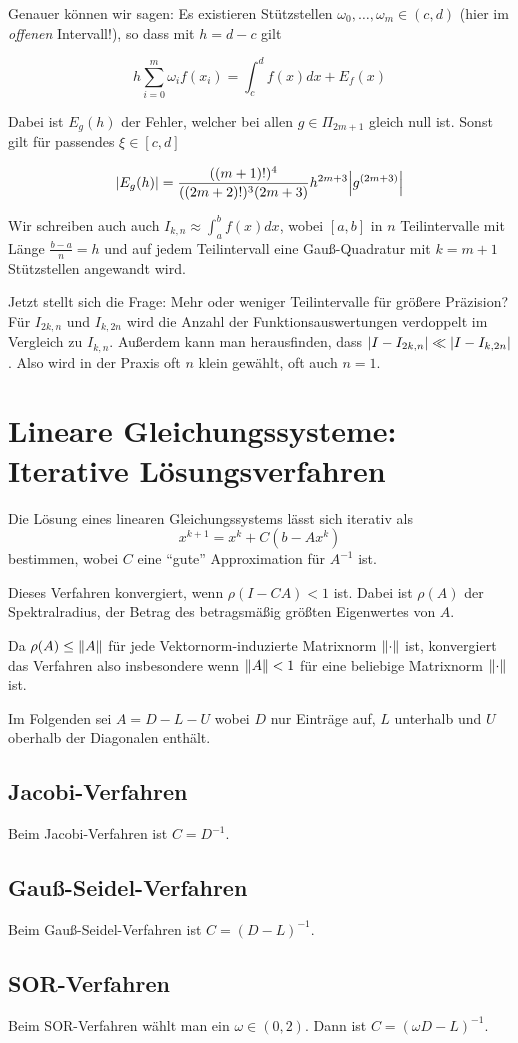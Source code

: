 \documentclass[a4paper,parskip=half*,DIV=15,fontsize=11pt]{scrartcl}
\DeclarePairedDelimiter\abs{\lvert}{\rvert}
\DeclarePairedDelimiter\norm{\lVert}{\rVert}
\begin{document}
Genauer können wir sagen: Es existieren Stützstellen $\omega_0, \ldots, \omega_m \in (c, d)$ (hier im \emph{offenen} Intervall!), so dass mit $h = d - c$ gilt

\[
  h \sum_{i=0}^m \omega_i f(x_i) = \int_c^d f(x) dx + E_f(x)
\]

Dabei ist $E_g(h)$ der Fehler, welcher bei allen $g \in \Pi_{2m+1}$ gleich null ist. Sonst gilt für passendes $\xi \in [c, d]$

\[
  \abs*{E_g(h)} = \frac{((m+1)!)^4}{((2m+2)!)^3 (2m+3)} h^{2m+3} \abs*{g^{(2m+3)}}
\]

Wir schreiben auch auch $I_{k,n} \approx \int_a^b f(x) dx$, wobei $[a, b]$ in $n$ Teilintervalle mit Länge $\frac{b-a}{n} = h$ und auf jedem Teilintervall eine Gauß-Quadratur mit $k = m + 1$ Stützstellen angewandt wird.

Jetzt stellt sich die Frage: Mehr oder weniger Teilintervalle für größere Präzision? Für $I_{2k,n}$ und $I_{k,2n}$ wird die Anzahl der Funktionsauswertungen verdoppelt im Vergleich zu $I_{k,n}$. Außerdem kann man herausfinden, dass $\abs{I - I_{2k,n}} \ll \abs{I - I_{k,2n}}$. Also wird in der Praxis oft $n$ klein gewählt, oft auch $n = 1$.

\section{Lineare Gleichungssysteme: Iterative Lösungsverfahren}

Die Lösung eines linearen Gleichungssystems lässt sich iterativ als
\[x^{k+1} = x^k+ C(b-Ax^k)\]
bestimmen, wobei $C$ eine ``gute'' Approximation für $A^{-1}$ ist.

Dieses Verfahren konvergiert, wenn $\rho(I-CA) < 1$ ist. Dabei ist $\rho(A)$ der Spektralradius, der Betrag des betragsmäßig größten Eigenwertes von $A$.

Da $\rho(A) \le \norm{A}$ für jede Vektornorm-induzierte Matrixnorm $\norm{\cdot}$ ist, konvergiert das Verfahren also insbesondere wenn $\norm{A} < 1$ für eine beliebige Matrixnorm $\norm{\cdot}$ ist.

Im Folgenden sei $A = D-L-U$ wobei $D$ nur Einträge auf, $L$ unterhalb und $U$ oberhalb der Diagonalen enthält.

\subsection{Jacobi-Verfahren}

Beim Jacobi-Verfahren ist $C = D^{-1}$.

\subsection{Gauß-Seidel-Verfahren}

Beim Gauß-Seidel-Verfahren ist $C = (D-L)^{-1}$.

\subsection{SOR-Verfahren}

Beim SOR-Verfahren wählt man ein $\omega \in (0,2)$. Dann ist $C = (\omega D - L)^{-1}$.
\end{document}
